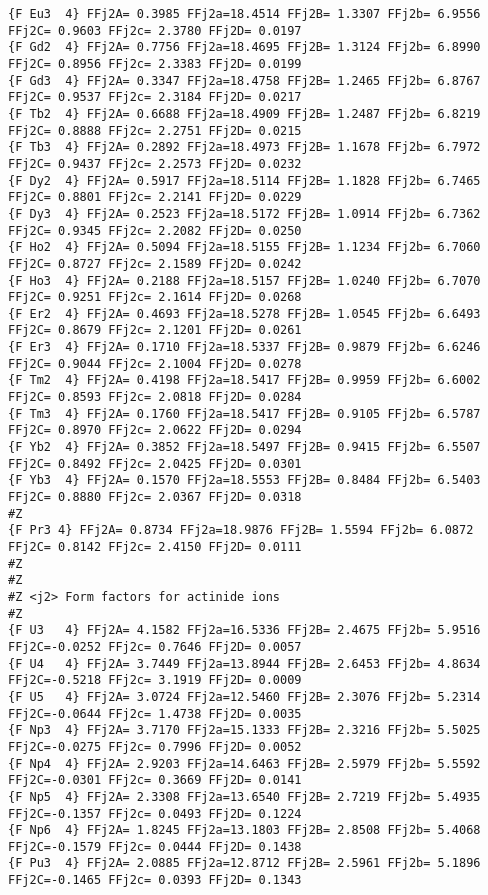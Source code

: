 {\begin{verbatim}
{F Eu3  4} FFj2A= 0.3985 FFj2a=18.4514 FFj2B= 1.3307 FFj2b= 6.9556 FFj2C= 0.9603 FFj2c= 2.3780 FFj2D= 0.0197 
{F Gd2  4} FFj2A= 0.7756 FFj2a=18.4695 FFj2B= 1.3124 FFj2b= 6.8990 FFj2C= 0.8956 FFj2c= 2.3383 FFj2D= 0.0199 
{F Gd3  4} FFj2A= 0.3347 FFj2a=18.4758 FFj2B= 1.2465 FFj2b= 6.8767 FFj2C= 0.9537 FFj2c= 2.3184 FFj2D= 0.0217 
{F Tb2  4} FFj2A= 0.6688 FFj2a=18.4909 FFj2B= 1.2487 FFj2b= 6.8219 FFj2C= 0.8888 FFj2c= 2.2751 FFj2D= 0.0215 
{F Tb3  4} FFj2A= 0.2892 FFj2a=18.4973 FFj2B= 1.1678 FFj2b= 6.7972 FFj2C= 0.9437 FFj2c= 2.2573 FFj2D= 0.0232 
{F Dy2  4} FFj2A= 0.5917 FFj2a=18.5114 FFj2B= 1.1828 FFj2b= 6.7465 FFj2C= 0.8801 FFj2c= 2.2141 FFj2D= 0.0229 
{F Dy3  4} FFj2A= 0.2523 FFj2a=18.5172 FFj2B= 1.0914 FFj2b= 6.7362 FFj2C= 0.9345 FFj2c= 2.2082 FFj2D= 0.0250 
{F Ho2  4} FFj2A= 0.5094 FFj2a=18.5155 FFj2B= 1.1234 FFj2b= 6.7060 FFj2C= 0.8727 FFj2c= 2.1589 FFj2D= 0.0242 
{F Ho3  4} FFj2A= 0.2188 FFj2a=18.5157 FFj2B= 1.0240 FFj2b= 6.7070 FFj2C= 0.9251 FFj2c= 2.1614 FFj2D= 0.0268 
{F Er2  4} FFj2A= 0.4693 FFj2a=18.5278 FFj2B= 1.0545 FFj2b= 6.6493 FFj2C= 0.8679 FFj2c= 2.1201 FFj2D= 0.0261 
{F Er3  4} FFj2A= 0.1710 FFj2a=18.5337 FFj2B= 0.9879 FFj2b= 6.6246 FFj2C= 0.9044 FFj2c= 2.1004 FFj2D= 0.0278 
{F Tm2  4} FFj2A= 0.4198 FFj2a=18.5417 FFj2B= 0.9959 FFj2b= 6.6002 FFj2C= 0.8593 FFj2c= 2.0818 FFj2D= 0.0284 
{F Tm3  4} FFj2A= 0.1760 FFj2a=18.5417 FFj2B= 0.9105 FFj2b= 6.5787 FFj2C= 0.8970 FFj2c= 2.0622 FFj2D= 0.0294 
{F Yb2  4} FFj2A= 0.3852 FFj2a=18.5497 FFj2B= 0.9415 FFj2b= 6.5507 FFj2C= 0.8492 FFj2c= 2.0425 FFj2D= 0.0301 
{F Yb3  4} FFj2A= 0.1570 FFj2a=18.5553 FFj2B= 0.8484 FFj2b= 6.5403 FFj2C= 0.8880 FFj2c= 2.0367 FFj2D= 0.0318 
#Z
{F Pr3 4} FFj2A= 0.8734 FFj2a=18.9876 FFj2B= 1.5594 FFj2b= 6.0872 FFj2C= 0.8142 FFj2c= 2.4150 FFj2D= 0.0111 
#Z
#Z
#Z <j2> Form factors for actinide ions
#Z
{F U3   4} FFj2A= 4.1582 FFj2a=16.5336 FFj2B= 2.4675 FFj2b= 5.9516 FFj2C=-0.0252 FFj2c= 0.7646 FFj2D= 0.0057 
{F U4   4} FFj2A= 3.7449 FFj2a=13.8944 FFj2B= 2.6453 FFj2b= 4.8634 FFj2C=-0.5218 FFj2c= 3.1919 FFj2D= 0.0009 
{F U5   4} FFj2A= 3.0724 FFj2a=12.5460 FFj2B= 2.3076 FFj2b= 5.2314 FFj2C=-0.0644 FFj2c= 1.4738 FFj2D= 0.0035 
{F Np3  4} FFj2A= 3.7170 FFj2a=15.1333 FFj2B= 2.3216 FFj2b= 5.5025 FFj2C=-0.0275 FFj2c= 0.7996 FFj2D= 0.0052 
{F Np4  4} FFj2A= 2.9203 FFj2a=14.6463 FFj2B= 2.5979 FFj2b= 5.5592 FFj2C=-0.0301 FFj2c= 0.3669 FFj2D= 0.0141 
{F Np5  4} FFj2A= 2.3308 FFj2a=13.6540 FFj2B= 2.7219 FFj2b= 5.4935 FFj2C=-0.1357 FFj2c= 0.0493 FFj2D= 0.1224 
{F Np6  4} FFj2A= 1.8245 FFj2a=13.1803 FFj2B= 2.8508 FFj2b= 5.4068 FFj2C=-0.1579 FFj2c= 0.0444 FFj2D= 0.1438 
{F Pu3  4} FFj2A= 2.0885 FFj2a=12.8712 FFj2B= 2.5961 FFj2b= 5.1896 FFj2C=-0.1465 FFj2c= 0.0393 FFj2D= 0.1343 

\end{verbatim}}
